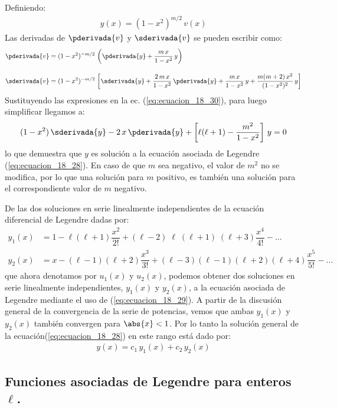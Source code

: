 \par
Definiendo:
\begin{align*}
y(x) = (1 - x^{2}) ^{m/2} \, v(x)
\end{align*}
Las derivadas de $\pderivada{v}$ y $\sderivada{v}$ se pueden escribir como:
\begin{align*}
\pderivada{v} &= (1 - x^{2})^{-m/2} \, \left( \pderivada{y} + \dfrac{m \, x}{1 -x^{2}} \, y \right) \\[1em]
\sderivada{v} &= (1 - x^{2})^{-m/2} \, \left[ \sderivada{y} + \dfrac{2 \, m \, x}{1 -x^{2}} \, \pderivada{y} + \dfrac{m \, x}{1 -x^{2}} \, y + \dfrac{m(m + 2) \, x^{2}}{(1 -x^{2})^{2}} \, y \right]
\end{align*}
Sustituyendo las expresiones en la ec. (\ref{eq:ecuacion_18_30}), para luego simplificar llegamos a:
\begin{align*}
(1 - x^{2}) \, \sderivada{y} - 2 \, x \, \pderivada{y} + \left[ \ell (\ell + 1) - \dfrac{m^{2}}{1 - x^{2}} \right] \, y = 0
\end{align*}
lo que demuestra que $y$ es solución a la ecuación asociada de Legendre (\ref{eq:ecuacion_18_28}). En caso de que $m$ sea negativo, el valor de $m^{2}$ no se modifica, por lo que una solución para $m$ positivo, es también una solución para el correspondiente valor de $m$ negativo.
\par
De las dos soluciones en serie linealmente independientes de la ecuación diferencial de Legendre dadas por:
\begin{align*}
y_{1}(x) &= 1 - \ell (\ell + 1) \dfrac{x^{2}}{2!} + (\ell - 2)\; \ell \; (\ell + 1)\;(\ell + 3) \dfrac{x^{4}}{4!} - \ldots \\[1em]
y_{2}(x) &= x - (\ell - 1)(\ell + 2) \dfrac{x^{3}}{3!} + (\ell - 3) (\ell - 1)(\ell + 2)(\ell + 4) \dfrac{x^{5}}{5!} - \ldots
\end{align*}
que ahora denotamos por $u_{1} (x)$ y $u_{2}(x)$, podemos obtener dos soluciones en serie linealmente independientes, $y_{1} (x)$ y $y_{2} (x)$, a la ecuación asociada de Legendre mediante el uso de (\ref{eq:ecuacion_18_29}). A partir de la discusión general de la convergencia de la serie de potencias, vemos que ambas $y_{1} (x)$ y $y_{2} (x)$ también convergen para $\abs{x} < 1$. Por lo tanto la solución general de la ecuación(\ref{eq:ecuacion_18_28}) en este rango está dado por:
\begin{align*}
y(x) = c_{1} \, y_{1} (x) + c_{2} \, y_{2} (x)
\end{align*}

\subsection{Funciones asociadas de Legendre para enteros \texorpdfstring{$\ell$}{l}.}

